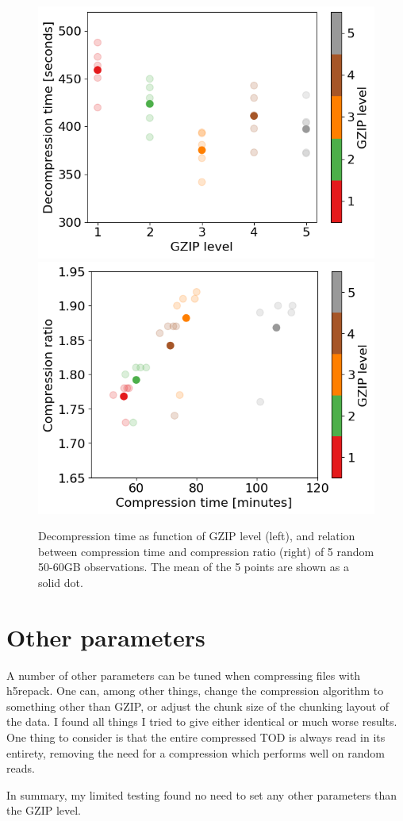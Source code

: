 \documentclass[10pt, a4paper]{article}
\begin{document}
\begin{figure}[H]
    \centering
    \includegraphics[scale=0.55]{gzip_decomptime.png}
    \includegraphics[scale=0.55]{comptime_compratio.png}
    \caption{Decompression time as function of GZIP level (left), and relation between compression time and compression ratio (right) of 5 random 50-60GB observations. The mean of the 5 points are shown as a solid dot.}
    \label{}
\end{figure}


\section*{Other parameters}
A number of other parameters can be tuned when compressing files with h5repack. One can, among other things, change the compression algorithm to something other than GZIP, or adjust the chunk size of the chunking layout of the data. I found all things I tried to give either identical or much worse results. One thing to consider is that the entire compressed TOD is always read in its entirety, removing the need for a compression which performs well on random reads.

In summary, my limited testing found no need to set any other parameters than the GZIP level.
\end{document}
